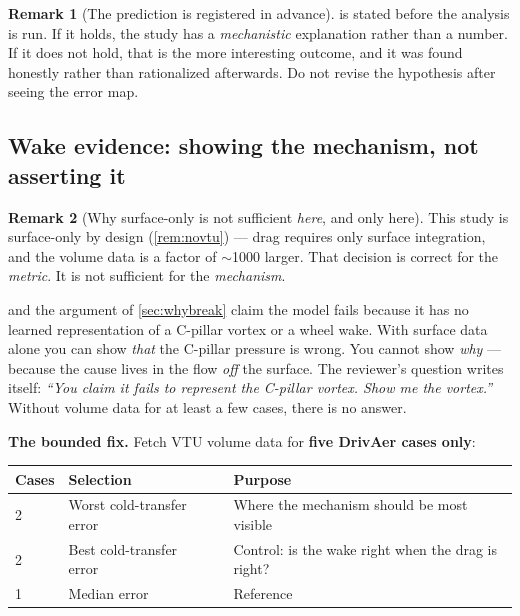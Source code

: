 \documentclass[10pt,a4paper]{article}
\theoremstyle{definition}
\newtheorem{remark}{Remark}[section]
\DeclareMathOperator{\Cd}{C_d}
\begin{document}
\begin{remark}[The prediction is registered in advance]
 is stated before the analysis is run. If it holds, the study
has a \emph{mechanistic} explanation rather than a number. If it does not hold, that
is the more interesting outcome, and it was found honestly rather than rationalized
afterwards. Do not revise the hypothesis after seeing the error map.
\end{remark}

\subsection{Wake evidence: showing the mechanism, not asserting it}
\label{sec:wake}

\begin{remark}[Why surface-only is not sufficient \emph{here}, and only here]
\label{rem:wakegap}
This study is surface-only by design (\cref{rem:novtu}) --- drag requires only surface
integration, and the volume data is a factor of $\sim$1000 larger. That decision is
correct for the \emph{metric}. It is not sufficient for the \emph{mechanism}.

 and the argument of \cref{sec:whybreak} claim the model fails
because it has no learned representation of a C-pillar vortex or a wheel wake. With
surface data alone you can show \emph{that} the C-pillar pressure is wrong. You cannot
show \emph{why} --- because the cause lives in the flow \emph{off} the surface. The
reviewer's question writes itself: \emph{``You claim it fails to represent the C-pillar
vortex. Show me the vortex.''} Without volume data for at least a few cases, there is
no answer.
\end{remark}

\textbf{The bounded fix.} Fetch VTU volume data for \textbf{five DrivAer cases only}:

\begin{center}\small
\begin{tabular}{@{}p{2.2cm}p{4.4cm}p{8.6cm}@{}}
\toprule
\textbf{Cases} & \textbf{Selection} & \textbf{Purpose} \\
\midrule
2 & Worst cold-transfer $\Cd$ error & Where the mechanism should be most visible \\
2 & Best cold-transfer $\Cd$ error  & Control: is the wake right when the drag is right? \\
1 & Median error                    & Reference \\
\bottomrule
\end{tabular}
\end{center}
\end{document}
